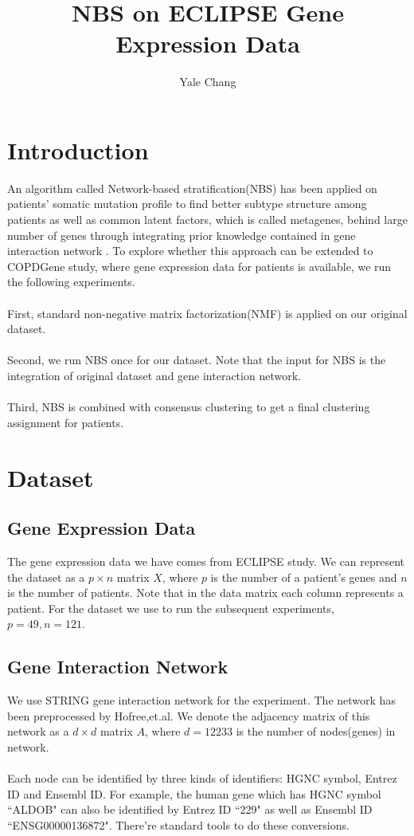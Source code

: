 \documentclass[11pt]{article}
\title{\textbf{NBS on ECLIPSE Gene Expression Data}}
\author{Yale Chang}
\begin{document}
\maketitle

\section{Introduction}
An algorithm called Network-based stratification(NBS)\cite{nbs} has been applied on patients' somatic mutation profile to find better subtype structure among patients as well as common latent factors, which is called metagenes, behind large number of genes through integrating prior knowledge contained in gene interaction network . To explore whether this approach can be extended to COPDGene study, where gene expression data for patients is available, we run the following experiments.\\
\\
First, standard non-negative matrix factorization(NMF) is applied on our original dataset.\\
\\
Second, we run NBS once for our dataset. Note that the input for NBS is the integration of original dataset and gene interaction network.\\
\\
Third, NBS is combined with consensus clustering to get a final clustering assignment for patients.

\section{Dataset}
\subsection{Gene Expression Data}
The gene expression data we have comes from ECLIPSE study\cite{eclipse}. We can represent the dataset as a $p\times n$ matrix $X$, where $p$ is the number of a patient's genes and $n$ is the number of patients. Note that in the data matrix each column represents a patient. For the dataset we use to run the subsequent experiments, $p=49,n=121$. 
\subsection{Gene Interaction Network}
We use STRING gene interaction network\cite{string} for the experiment. The network has been preprocessed by Hofree,et.al\cite{nbs_code}. We denote the adjacency matrix of this network as a $d\times d$ matrix $A$, where $d=12233$ is the number of nodes(genes) in network. \\
\\
Each node can be identified by three kinds of identifiers: HGNC symbol, Entrez ID and Ensembl ID. For example, the human gene which has HGNC symbol ``ALDOB" can also be identified by Entrez ID ``229" as well as Ensembl ID ``ENSG00000136872". There're standard tools to do these conversions\cite{hgnc}.
\end{document}
